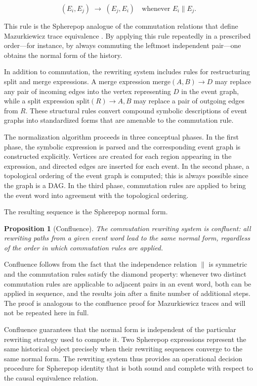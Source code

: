 \documentclass[12pt]{article}
\theoremstyle{plain}
\newtheorem{proposition}[theorem]{Proposition}
\theoremstyle{definition}
\theoremstyle{remark}
\begin{document}
\[
  (E_i, E_j) \;\longrightarrow\; (E_j, E_i)
  \quad\text{whenever } E_i \parallel E_j.
\]

This rule is the Spherepop analogue of the commutation relations that define
Mazurkiewicz trace equivalence \citep{Mazurkiewicz1987}.  By applying this
rule repeatedly in a prescribed order---for instance, by always commuting the
leftmost independent pair---one obtains the normal form of the history.

In addition to commutation, the rewriting system includes rules for
restructuring split and merge expressions.  A merge expression
$\text{merge}(A, B) \rightarrow D$ may replace any pair of incoming edges
into the vertex representing $D$ in the event graph, while a split expression
$\text{split}(R) \rightarrow A, B$ may replace a pair of outgoing edges from
$R$.  These structural rules convert compound symbolic descriptions of event
graphs into standardized forms that are amenable to the commutation rule.

The normalization algorithm proceeds in three conceptual phases.  In the first
phase, the symbolic expression is parsed and the corresponding event graph is
constructed explicitly.  Vertices are created for each region appearing in
the expression, and directed edges are inserted for each event.  In the second
phase, a topological ordering of the event graph is computed; this is always
possible since the graph is a DAG.  In the third phase, commutation rules are
applied to bring the event word into agreement with the topological ordering.

The resulting sequence is the Spherepop normal form.

\begin{proposition}[Confluence]
The commutation rewriting system is confluent: all rewriting paths from a
given event word lead to the same normal form, regardless of the order in
which commutation rules are applied.
\end{proposition}

Confluence follows from the fact that the independence relation $\parallel$
is symmetric and the commutation rules satisfy the diamond property: whenever
two distinct commutation rules are applicable to adjacent pairs in an event
word, both can be applied in sequence, and the results join after a finite
number of additional steps.  The proof is analogous to the confluence proof
for Mazurkiewicz traces \citep{Mazurkiewicz1987} and will not be repeated here
in full.

Confluence guarantees that the normal form is independent of the particular
rewriting strategy used to compute it.  Two Spherepop expressions represent
the same historical object precisely when their rewriting sequences converge
to the same normal form.  The rewriting system thus provides an operational
decision procedure for Spherepop identity that is both sound and complete with
respect to the causal equivalence relation.
\end{document}
